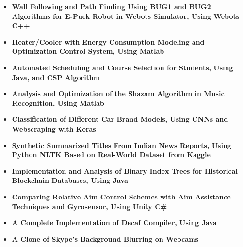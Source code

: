 \begin{cventries}
{  %
  \begin{itemize}
    \item \textbf{Wall Following and Path Finding Using BUG1 and BUG2 Algorithms for E-Puck Robot in Webots Simulator, Using Webots C++}
    \item \textbf{Heater/Cooler with Energy Consumption Modeling and Optimization Control System, Using Matlab}
    \item \textbf{Automated Scheduling and Course Selection for Students, Using Java, and CSP Algorithm}
    \item \textbf{Analysis and Optimization of the Shazam Algorithm in Music Recognition, Using Matlab}
    \item \textbf{Classification of Different Car Brand Models, Using CNNs and Webscraping with Keras}
    \item \textbf{Synthetic Summarized Titles From Indian News Reports, Using Python NLTK Based on Real-World Dataset from Kaggle}
    \item \textbf{Implementation and Analysis of Binary Index Trees for Historical Blockchain Databases, Using Java}
    \item \textbf{Comparing Relative Aim Control Schemes with Aim Assistance Techniques and Gyrosensor, Using Unity C\#}
    \item \textbf{A Complete Implementation of Decaf Compiler, Using Java}
    \item \textbf{A Clone of Skype's Background Blurring on Webcams}
  \end{itemize}
}
\end{cventries}
\vspace{0.5 cm}
